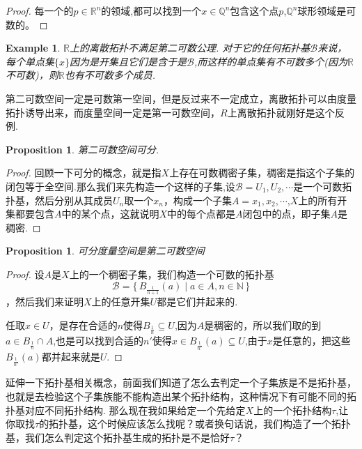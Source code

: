 \documentclass{article}
\newtheorem{proposition}[theorem]{Proposition}
\newtheorem{example}[theorem]{Example}
\newcommand\Set[2]{\{\,#1\mid#2\,\}} %
\begin{document}
\begin{proof}
每一个的$p \in \mathbb{R}^n$的领域,都可以找到一个$x \in \mathbb{Q}^n$包含这个点$p$,$\mathbb{Q}^n$球形领域是可数的。
\end{proof}

\begin{example}
$\mathbb{R}$上的离散拓扑不满足第二可数公理. 对于它的任何拓扑基$\mathscr{B}$来说，每个单点集$\{x\}$因为是开集且它们是含于是$\mathscr{B}$,而这样的单点集有不可数多个(因为$\mathbb{R}$不可数)，则$\mathbb{R}$也有不可数多个成员.
\end{example}

第二可数空间一定是可数第一空间，但是反过来不一定成立，离散拓扑可以由度量拓扑诱导出来，而度量空间一定是第一可数空间，$R$上离散拓扑就刚好是这个反例.

\begin{proposition}
第二可数空间可分.
\end{proposition}

\begin{proof}
回顾一下可分的概念，就是指$X$上存在可数稠密子集，稠密是指这个子集的闭包等于全空间.那么我们来先构造一个这样的子集,设$\mathscr{B}={U_1,U_2,\cdots}$是一个可数拓扑基，然后分别从其成员$U_n$取一个$x_n$，构成一个子集$A={x_1,x_2,\cdots}$,$X$上的所有开集都要包含$A$中的某个点，这就说明$X$中的每个点都是$A$闭包中的点，即子集$A$是稠密.
\end{proof}

\begin{proposition}
可分度量空间是第二可数空间
\end{proposition}

\begin{proof}
设$A$是$X$上的一个稠密子集，我们构造一个可数的拓扑基\[\mathscr{B}=\Set{B_{\frac{1}{n+1}}(a)}{a \in A,n \in \mathbb{N}}\]，然后我们来证明$X$上的任意开集$U$都是它们并起来的.

任取$x \in U$，是存在合适的$n$使得$B_{\frac{1}{n}} \subseteq U$,因为$A$是稠密的，所以我们取的到$a \in B_{\frac{1}{n}} \cap A$,也是可以找到合适的$n'$使得$x \in B_{\frac{1}{n'}}(a) \subseteq U$,由于$x$是任意的，把这些$B_{\frac{1}{n'}}(a)$都并起来就是$U$.
\end{proof}

延伸一下拓扑基相关概念，前面我们知道了怎么去判定一个子集族是不是拓扑基，也就是去检验这个子集族能不能构造出某个拓扑结构，这种情况下有可能不同的拓扑基对应不同拓扑结构. 那么现在我如果给定一个先给定$X$上的一个拓扑结构$\tau$,让你取找$\tau$的拓扑基，这个时候应该怎么找呢？或者换句话说，我们构造了一个拓扑基，我们怎么判定这个拓扑基生成的拓扑是不是恰好$\tau$？
\end{document}
